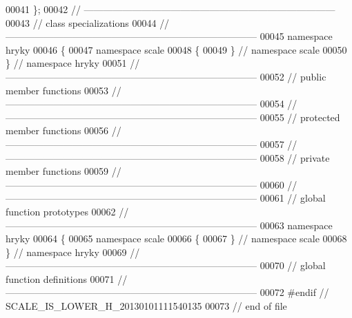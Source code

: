 \begin{DoxyCode}
00041 \};
00042 \textcolor{comment}{//
      ------------------------------------------------------------------------------}
00043 \textcolor{comment}{// class specializations}
00044 \textcolor{comment}{//
      ------------------------------------------------------------------------------}
00045 \textcolor{keyword}{namespace }hryky
00046 \{
00047 \textcolor{keyword}{namespace }scale
00048 \{
00049 \} \textcolor{comment}{// namespace scale}
00050 \} \textcolor{comment}{// namespace hryky}
00051 \textcolor{comment}{//
      ------------------------------------------------------------------------------}
00052 \textcolor{comment}{// public member functions}
00053 \textcolor{comment}{//
      ------------------------------------------------------------------------------}
00054 \textcolor{comment}{//
      ------------------------------------------------------------------------------}
00055 \textcolor{comment}{// protected member functions}
00056 \textcolor{comment}{//
      ------------------------------------------------------------------------------}
00057 \textcolor{comment}{//
      ------------------------------------------------------------------------------}
00058 \textcolor{comment}{// private member functions}
00059 \textcolor{comment}{//
      ------------------------------------------------------------------------------}
00060 \textcolor{comment}{//
      ------------------------------------------------------------------------------}
00061 \textcolor{comment}{// global function prototypes}
00062 \textcolor{comment}{//
      ------------------------------------------------------------------------------}
00063 \textcolor{keyword}{namespace }hryky
00064 \{
00065 \textcolor{keyword}{namespace }scale
00066 \{
00067 \} \textcolor{comment}{// namespace scale}
00068 \} \textcolor{comment}{// namespace hryky}
00069 \textcolor{comment}{//
      ------------------------------------------------------------------------------}
00070 \textcolor{comment}{// global function definitions}
00071 \textcolor{comment}{//
      ------------------------------------------------------------------------------}
00072 \textcolor{preprocessor}{#endif // SCALE\_IS\_LOWER\_H\_20130101111540135}
00073 \textcolor{preprocessor}{}\textcolor{comment}{// end of file}
\end{DoxyCode}
